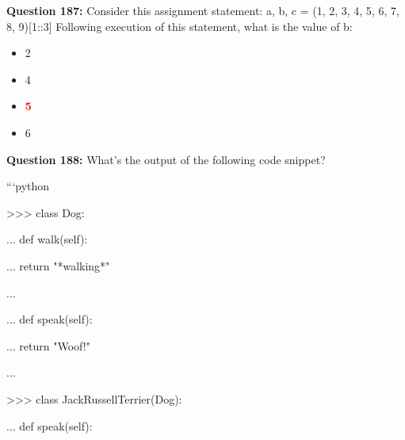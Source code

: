 \documentclass[12pt,a4paper]{article}
\begin{document}
\vspace{0.5cm}

\textbf{Question 187:} Consider this assignment statement: a, b, c = (1, 2, 3, 4, 5, 6, 7, 8, 9)[1::3] Following execution of this statement, what is the value of b:

\begin{itemize}
    \item[\textbf{A.}] 2
    \item[\textbf{B.}] 4
    \item[\textbf{C.}] \textcolor{red}{\textbf{5}}
    \item[\textbf{D.}] 6
\end{itemize}

\vspace{0.5cm}

\textbf{Question 188:} What's the output of the following code snippet?\newline

\newline
\newline

\newline
```python\newline

\newline
>>> class Dog:\newline

\newline
...     def walk(self):\newline

\newline
...         return "*walking*"\newline

\newline
...\newline

\newline
...     def speak(self):\newline

\newline
...         return "Woof!"\newline

\newline
...\newline

\newline
>>> class JackRussellTerrier(Dog):\newline

\newline
...     def speak(self):\newline
\end{document}

